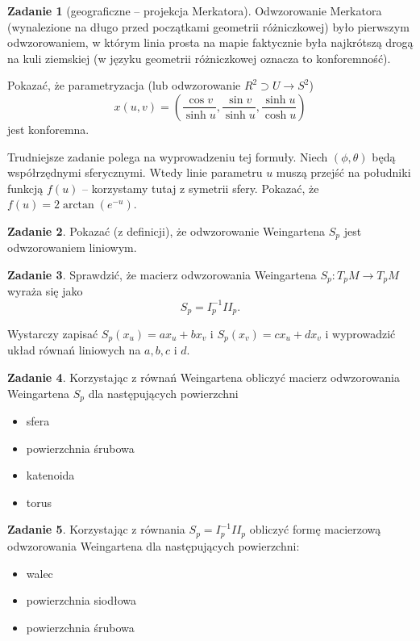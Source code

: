 \documentclass[a4paper,11pt]{article}
\theoremstyle{definition}\newtheorem{exercise}{Zadanie}
\theoremstyle{definition}\newtheorem{remark}{Uwaga}
\begin{document}
\begin{exercise}[geograficzne -- projekcja Merkatora]
 Odwzorowanie Merkatora (wynalezione na długo przed początkami geometrii 
r\'ożniczkowej) było pierwszym odwzorowaniem, w kt\'orym linia prosta na mapie 
faktycznie była najkr\'otszą drogą na kuli ziemskiej (w języku geometrii 
r\'ożniczkowej oznacza to konforemność).

Pokazać, że parametryzacja (lub odwzorowanie $R^2 \supset U \to S^2$)
\[x(u,v)=\left( \frac{\cos v}{\sinh u}, \frac{\sin v}{\sinh u}, 
\frac{\sinh u}{\cosh u}\right)\]
jest konforemna.

\small{Trudniejsze zadanie polega na wyprowadzeniu tej formuły. Niech 
$(\phi,\theta)$ będą wsp\'ołrzędnymi sferycznymi. Wtedy linie parametru $u$ 
muszą przejść na południki funkcją $f(u)$ -- korzystamy tutaj z symetrii sfery. 
Pokazać, że $f(u)=2\arctan(e^{-u})$.}

\end{exercise}



\begin{exercise}
Pokazać (z definicji), że odwzorowanie Weingartena $S_p$ jest odwzorowaniem 
liniowym.
\end{exercise}

\begin{exercise}
 Sprawdzić, że macierz odwzorowania Weingartena $S_p \colon T_p 
M \to T_p M$ wyraża się jako
\[S_p = I_p^{-1} II_p. \]
 
 \small{Wystarczy zapisać $S_p(x_u)=ax_u + bx_v$ i $S_p(x_v)=cx_u + d x_v$ i 
wyprowadzić układ r\'ownań liniowych na $a,b,c$ i $d$.}
\end{exercise}

\begin{exercise}
Korzystając z r\'ownań Weingartena obliczyć macierz odwzorowania Weingartena
$S_p$ dla następujących powierzchni
\begin{itemize}
 \item sfera
 \item powierzchnia śrubowa
 \item katenoida
 \item torus
\end{itemize}

\end{exercise}

\begin{exercise}
Korzystając z r\'ownania $S_p = I_p^{-1} II_p$ obliczyć formę macierzową 
odwzorowania Weingartena dla następujących powierzchni:
\begin{itemize}
 \item walec
 \item powierzchnia siodłowa
 \item powierzchnia śrubowa
\end{itemize}

\end{exercise}
\end{document}
